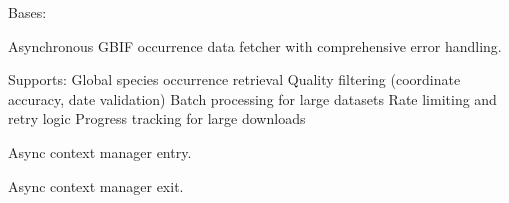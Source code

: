 \documentclass[letterpaper,10pt,english]{sphinxmanual}
\begin{document}
\begin{fulllineitems}
\label{\detokenize{api_reference:app.services.gbif_fetcher.GBIFFetcher}}
\pysigstartsignatures
\pysigline
{}
\pysigstopsignatures
\sphinxAtStartPar
Bases: 

\sphinxAtStartPar
Asynchronous GBIF occurrence data fetcher with comprehensive error handling.

\sphinxAtStartPar
Supports:
\sphinxhyphen{} Global species occurrence retrieval
\sphinxhyphen{} Quality filtering (coordinate accuracy, date validation)
\sphinxhyphen{} Batch processing for large datasets
\sphinxhyphen{} Rate limiting and retry logic
\sphinxhyphen{} Progress tracking for large downloads

\begin{fulllineitems}
\label{\detokenize{api_reference:app.services.gbif_fetcher.GBIFFetcher.__aenter__}}
\pysigstartsignatures
\pysiglinewithargsret
{}
{}
{}
\pysigstopsignatures
\sphinxAtStartPar
Async context manager entry.

\end{fulllineitems}


\begin{fulllineitems}
\label{\detokenize{api_reference:app.services.gbif_fetcher.GBIFFetcher.__aexit__}}
\pysigstartsignatures
\pysiglinewithargsret
{}
{\sphinxparamcomma {}\sphinxparamcomma {}}
{}
\pysigstopsignatures
\sphinxAtStartPar
Async context manager exit.

\end{fulllineitems}



\end{fulllineitems}
\end{document}
